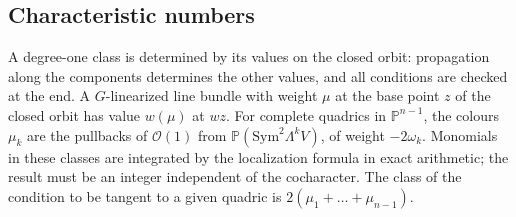 \documentclass[11pt]{amsart}
\theoremstyle{definition}
\theoremstyle{remark}
\newcommand{\PP}{\mathbb{P}}
\begin{document}
\subsection{Characteristic numbers}
A degree-one class is determined by its values on the closed orbit:
propagation along the components determines the other values, and all
conditions are checked at the end. A $G$-linearized line bundle with weight
$\mu$ at the base point $z$ of the closed orbit has value $w(\mu)$ at $wz$.
For complete quadrics in $\PP^{n-1}$, the colours $\mu_k$ are the pullbacks of
$\mathcal O(1)$ from $\PP(\mathrm{Sym}^2\Lambda^kV)$, of weight $-2\omega_k$.
Monomials in these classes are integrated by the localization formula
\cite{AtiyahBott84,BerlineVergne} in exact arithmetic; the result must be an
integer independent of the cocharacter. The class of the condition to be
tangent to a given quadric is $2(\mu_1+\dots+\mu_{n-1})$.
\end{document}
